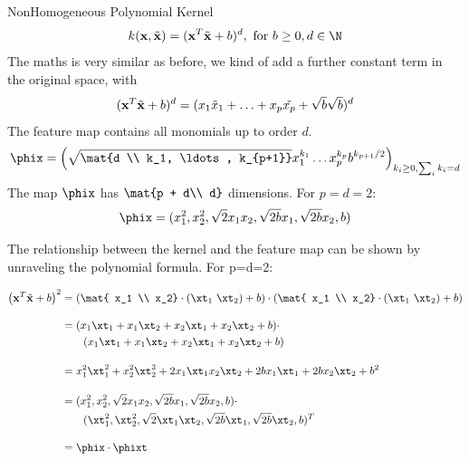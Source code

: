 \documentclass[11pt,compress,t,notes=noshow, xcolor=table]{beamer}
\begin{document}
\begin{vbframe}{NonHomogeneous Polynomial Kernel}
 $$k(\xv, \xtil) = (\xv^T \xtil + b)^d, \text{ for } b\geq 0, d \in \N$$
The maths is very similar as before, we kind of add a further constant term in the original space, with
$$ (\mathbf{x}^T \tilde{\mathbf{x}} + b)^d = (x_1 \tilde{x}_1 + \ldots + x_p \tilde{x_p} + \sqrt{b} \sqrt{b})^d$$
The feature map contains all monomials up to order $d$.
  $$\phix = \left( \sqrt{\mat{d \\ k_1, \ldots, k_{p+1}}} x_1^{k_1} \ldots x_p^{k_p} b^{k_{p+1}/2} \right)_{k_i \geq 0, \sum_i k_i = d}$$
The map $\phix$ has $\mat{p + d\\ d}$ dimensions. For $p=d=2$: 
$$\phix = (x_1^2, x_2^2, \sqrt{2} x_1 x_2, \sqrt{2b} x_1, \sqrt{2b} x_2, b)$$

\framebreak
  The relationship between the kernel and the feature map can be shown by unraveling the polynomial formula. For p=d=2:
  
  \begin{equation*}
    \begin{aligned}
        \left ( \xv^T \xtil + b  \right)^2 &=       \left ( \mat{ x_1 \\ x_2} \cdot (\xt_1 \ \xt_2) + b  \right) \cdot      \left ( \mat{ x_1 \\ x_2} \cdot (\xt_1 \ \xt_2) + b  \right) \\[10pt]
        &= (x_1 \xt_1 + x_1 \xt_2 + x_2 \xt_1 + x_2 \xt_2 + b) \cdot \\
         & \ \ \ \ \ \ (x_1 \xt_1 + x_1 \xt_2 + x_2 \xt_1 + x_2 \xt_2 + b) \\[10pt]
        &= x_1^2 \xt_1^2 + x_2^2 \xt_2^2  +  2  x_1 \xt_1 x_2 \xt_2  + 2 b x_1 \xt_1 + 2 b x_2 \xt_2  + b^2 \\[10pt]
        &= ( x_1^2 , x_2^2 , \sqrt{2} x_1 x_2 , \sqrt{2b} x_1 , \sqrt{2b} x_2 , b ) \cdot \\
        & \ \ \ \ \ \  ( \xt_1^2 , \xt_2^2 ,\sqrt{2} \xt_1 \xt_2 , \sqrt{2b} \xt_1 , \sqrt{2b} \xt_2 ,  b )^T \\[10pt]
        &= \phix \cdot \phixt
    \end{aligned}
  \end{equation*}
\end{vbframe}
\end{document}
